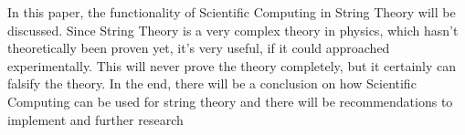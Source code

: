 \documentclass[../paper.tex]{subfiles}
\begin{document}
In this paper, the functionality of Scientific Computing in String Theory will be discussed. Since String Theory is a very complex theory in physics, which hasn't theoretically been proven yet, it's very useful, if it could approached experimentally. This will never prove the theory completely, but it certainly can falsify the theory. In the end, there will be a conclusion on how Scientific Computing can be used for string theory and there will be recommendations to implement and further research
\end{document}
